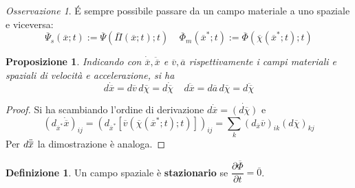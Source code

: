 \documentclass{book}
\theoremstyle{plain}
\theoremstyle{plain}
\theoremstyle{plain}
\theoremstyle{plain}
\theoremstyle{plain}
\newtheorem{prop}{Proposizione}[chapter]
\theoremstyle{definition}
\newtheorem{defi}{Definizione}[chapter]
\theoremstyle{remark}
\newtheorem*{oss}{Osservazione}
\theoremstyle{definition}
\begin{document}
\begin{oss}
    É sempre possibile passare da un campo materiale a uno spaziale e viceversa:
    \begin{displaymath}
        \overline{\Psi}_s(\overline{x};t):= \overline{\Psi}\left(\overline{\Pi}(\overline{x};t);t\right) \ \ \ \ \ \overline{\Phi}_m(\overline{x}^*;t):= \overline{\Phi}\left(\overline{\chi}(\overline{x}^*;t);t\right)
    \end{displaymath}
\end{oss}

\begin{prop}
    Indicando con $\dot{\overline{x}}, \ddot{\overline{x}}$ e $\overline{v},\overline{a}$ rispettivamente i campi materiali e spaziali di velocità e accelerazione, si ha
    \begin{displaymath}
        d\dot{\overline{x}}=d\overline{v}\, d\overline{\chi}= d\dot{\overline{\chi}} \ \ \ \ \ d\ddot{\overline{x}}=d\overline{a}\,d\overline{\chi}= d\ddot{\overline{\chi}}
    \end{displaymath}
\end{prop}

\begin{proof}
    Si ha scambiando l'ordine di derivazione $d\Dot{\overline{x}}=\Dot{(d\overline{\chi})}$ e
    \begin{displaymath}
        \left(d_{\overline{x}^*}\Dot{\overline{x}}\right)_{ij}=\left(d_{\overline{x}^*}\left[\overline{v}\left(\overline{\chi}(\overline{x}^*;t);t\right)\right]\right)_{ij}=\sum_k(d_{\overline{x}}\overline{v})_{ik}(d\overline{\chi})_{kj}
    \end{displaymath}
    Per $d\Ddot{\overline{x}}$ la dimostrazione è analoga.
\end{proof}
%
%
%
%
%
%
%
%
%
%
%
\begin{defi}
    Un campo spaziale è \textbf{stazionario} se $\dfrac{\partial \overline{\Phi}}{\partial t}=\overline{0}$.
\end{defi}
\end{document}
